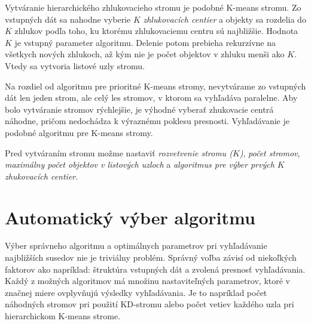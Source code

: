 \documentclass[12pt,oneside]{fithesis2}
\begin{document}
	Vytváranie hierarchického zhlukovacieho stromu je podobné K-means stromu.   Zo vstupných dát sa nahodne vyberie $K$ \textit{zhlukovacích centier} a objekty sa rozdelia do $K$ zhlukov podľa toho, ku ktorému zhlukovaciemu centru sú najbližšie. Hodnota $K$ je vstupný parameter algoritmu. Delenie potom prebieha rekurzívne na všetkych nových zhlukoch, až kým nie je počet objektov v zhluku menši ako $K$. Vtedy sa vytvoria listové uzly stromu. \cite{Attach:binary_matching_crv2012}
	
	Na rozdiel od algoritmu pre prioritné K-means stromy, nevytvárame zo vstupných dát len jeden strom, ale celý les stromov, v ktorom sa vyhľadáva paralelne. Aby bolo vytváranie stromov rýchlejšie, je výhodné vyberať zhukovacie centrá náhodne, pričom nedochádza k výraznému poklesu presnosti. Vyhľadávanie je podobné algoritmu pre K-means stromy. \cite{Attach:binary_matching_crv2012}
	
	Pred vytváraním stromu možme nastaviť \textit{rozvetvenie stromu ($K$)}, \textit{počet stromov}, \textit{maximálny počet objektov v listových uzloch} a \textit{algoritmus pre výber prvých $K$ zhukovacích centier}. \cite{Attach:binary_matching_crv2012}
	
	\section{Automatický výber algoritmu}
	Výber správneho algoritmu a optimálnych parametrov pri vyhľadávanie najbližších susedov nie je triviálny problém. Správný voľba závisí od niekoľkých faktorov ako napríklad: štruktúra vstupných dát a zvolená presnosť vyhľadávania. Každý z možných algoritmov má množinu nastaviteľných parametrov, ktoré v značnej miere ovplyvňujú výsledky vyhľadávania. Je to napríklad počet náhodných stromov pri použití KD-stromu alebo počet vetiev každého uzla pri hierarchickom K-means strome. \cite{muja_flann_2009} 
	
\end{document}
